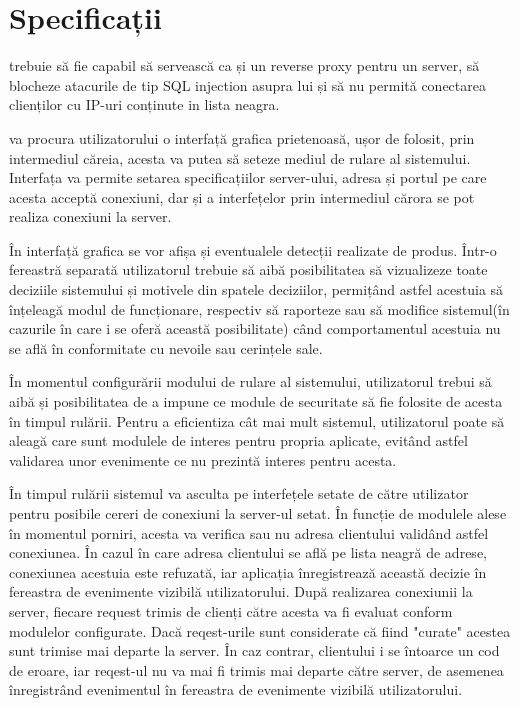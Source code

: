 \section{Specificații}
\textit{\thesistitle}  trebuie să fie capabil să servească ca și un reverse proxy pentru un server, să blocheze atacurile de tip SQL injection asupra lui și să nu permită conectarea clienților cu IP-uri conținute in lista neagra. 

\textit{\thesistitle}  va procura utilizatorului o interfață grafica prietenoasă, ușor de folosit, prin intermediul căreia, acesta va putea să seteze mediul de rulare al sistemului. Interfața va permite setarea specificațiilor server-ului, adresa și portul pe care acesta acceptă conexiuni, dar și a interfețelor prin intermediul cărora se pot realiza conexiuni la server. 
  
În interfață grafica se vor afișa și eventualele detecții realizate de produs. Într-o fereastră separată utilizatorul trebuie să aibă posibilitatea să vizualizeze toate deciziile sistemului și motivele din spatele deciziilor, permițând astfel acestuia să înțeleagă modul de funcționare, respectiv să raporteze sau să modifice sistemul(în cazurile în care i se oferă această posibilitate) când comportamentul acestuia nu se află în conformitate cu nevoile sau cerințele sale. 

În momentul configurării modului de rulare al sistemului, utilizatorul trebui să aibă și posibilitatea de a impune ce module de securitate să fie folosite de acesta în timpul rulării. Pentru a eficientiza cât mai mult sistemul, utilizatorul poate să aleagă care sunt modulele de interes pentru propria aplicate, evitând astfel validarea unor evenimente ce nu prezintă interes pentru acesta. 

 
În timpul rulării sistemul va asculta pe interfețele setate de către utilizator pentru posibile cereri de conexiuni la server-ul setat. În funcție de modulele alese în momentul porniri, acesta va verifica sau nu adresa clientului validând astfel conexiunea. În cazul în care adresa clientului se află pe lista neagră de adrese, conexiunea acestuia este refuzată, iar aplicația înregistrează această decizie în fereastra de evenimente vizibilă utilizatorului. După realizarea conexiunii la server, fiecare request trimis de clienți către acesta va fi evaluat conform modulelor configurate. Dacă reqest-urile sunt considerate că fiind "curate" acestea sunt trimise mai departe la server. În caz contrar, clientului i se întoarce un cod de eroare, iar reqest-ul nu va mai fi trimis mai departe către server, de asemenea înregistrând evenimentul în fereastra de evenimente vizibilă utilizatorului. 


